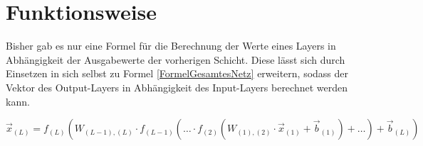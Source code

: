 \documentclass[
	a4paper,
	12pt,
	ngerman,
	oneside
]{scrreprt}											%
\begin{document}
	
			
		\section{Funktionsweise}
			Bisher gab es nur eine Formel für die Berechnung der Werte eines Layers in Abhängigkeit der Ausgabewerte der vorherigen Schicht. Diese lässt sich durch Einsetzen in sich selbst zu Formel \ref{FormelGesamtesNetz} erweitern, sodass der Vektor des Output-Layers in Abhängigkeit des Input-Layers berechnet werden kann. 

			\begin{equation}\label{FormelGesamtesNetz}
				\vec{x}_{(L)} = f_{(L)} \left( W_{(L-1),(L)} \cdot f_{(L-1)} \left(…\cdot f_{(2)} \left(W_{(1),(2)}\cdot\vec{x}_{(1)}+\vec{b}_{(1)}\right)+…\right)+\vec{b}_{(L)}\right)
			\end{equation}
			
\end{document}
